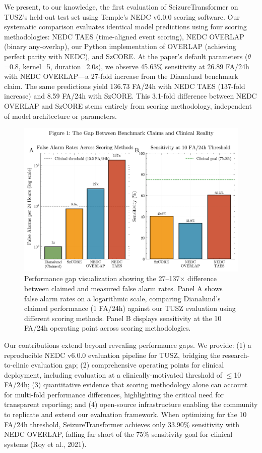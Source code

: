 \documentclass[10pt]{article}
\begin{document}
We present, to our knowledge, the first evaluation of SeizureTransformer on TUSZ's held-out test set using Temple's NEDC v6.0.0 scoring software. Our systematic comparison evaluates identical model predictions using four scoring methodologies: NEDC TAES (time-aligned event scoring), NEDC OVERLAP (binary any-overlap), our Python implementation of OVERLAP (achieving perfect parity with NEDC), and SzCORE. At the paper's default parameters ($\theta$=0.8, kernel=5, duration=2.0s), we observe 45.63\% sensitivity at 26.89 FA/24h with NEDC OVERLAP—a 27-fold increase from the Dianalund benchmark claim. The same predictions yield 136.73 FA/24h with NEDC TAES (137-fold increase) and 8.59 FA/24h with SzCORE. This 3.1-fold difference between NEDC OVERLAP and SzCORE stems entirely from scoring methodology, independent of model architecture or parameters.

\begin{figure}[h]
\centering
\includegraphics[width=\textwidth]{figures/fig1_performance_gap_optimized.png}
\caption{Performance gap visualization showing the 27--137$\times$ difference between claimed and measured false alarm rates. Panel A shows false alarm rates on a logarithmic scale, comparing Dianalund's claimed performance (1 FA/24h) against our TUSZ evaluation using different scoring methods. Panel B displays sensitivity at the 10 FA/24h operating point across scoring methodologies.}
\label{fig:performance-gap}
\end{figure}

Our contributions extend beyond revealing performance gaps. We provide: (1) a reproducible NEDC v6.0.0 evaluation pipeline for TUSZ, bridging the research-to-clinic evaluation gap; (2) comprehensive operating points for clinical deployment, including evaluation at a clinically-motivated threshold of $\leq$10 FA/24h; (3) quantitative evidence that scoring methodology alone can account for multi-fold performance differences, highlighting the critical need for transparent reporting; and (4) open-source infrastructure enabling the community to replicate and extend our evaluation framework. When optimizing for the 10 FA/24h threshold, SeizureTransformer achieves only 33.90\% sensitivity with NEDC OVERLAP, falling far short of the 75\% sensitivity goal for clinical systems (Roy et al., 2021).
\end{document}
